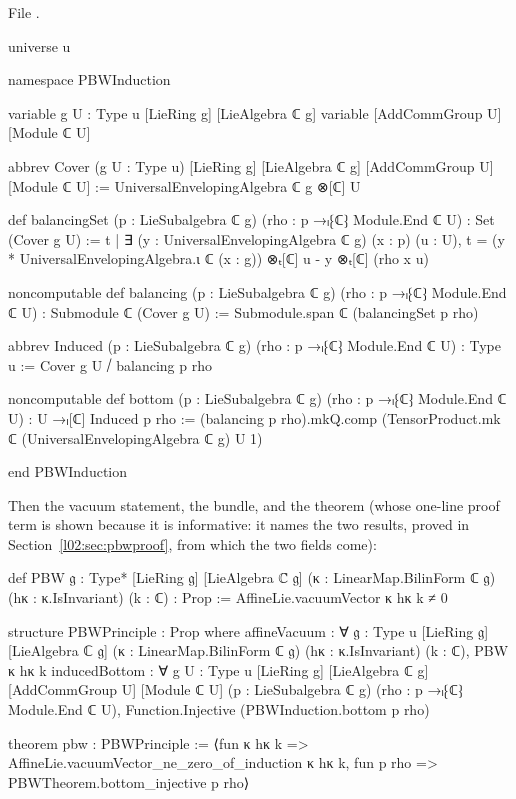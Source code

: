 File .
\begin{leancode}
universe u

namespace PBWInduction

variable {g U : Type u} [LieRing g] [LieAlgebra ℂ g]
variable [AddCommGroup U] [Module ℂ U]

abbrev Cover (g U : Type u) [LieRing g] [LieAlgebra ℂ g]
    [AddCommGroup U] [Module ℂ U] :=
  UniversalEnvelopingAlgebra ℂ g ⊗[ℂ] U

def balancingSet (p : LieSubalgebra ℂ g) (rho : p →ₗ⁅ℂ⁆ Module.End ℂ U) :
    Set (Cover g U) :=
  {t | ∃ (y : UniversalEnvelopingAlgebra ℂ g) (x : p) (u : U),
    t = (y * UniversalEnvelopingAlgebra.ι ℂ (x : g)) ⊗ₜ[ℂ] u - y ⊗ₜ[ℂ] (rho x u)}

noncomputable def balancing (p : LieSubalgebra ℂ g)
    (rho : p →ₗ⁅ℂ⁆ Module.End ℂ U) : Submodule ℂ (Cover g U) :=
  Submodule.span ℂ (balancingSet p rho)

abbrev Induced (p : LieSubalgebra ℂ g) (rho : p →ₗ⁅ℂ⁆ Module.End ℂ U) : Type u :=
  Cover g U ⧸ balancing p rho

noncomputable def bottom (p : LieSubalgebra ℂ g)
    (rho : p →ₗ⁅ℂ⁆ Module.End ℂ U) : U →ₗ[ℂ] Induced p rho :=
  (balancing p rho).mkQ.comp
    (TensorProduct.mk ℂ (UniversalEnvelopingAlgebra ℂ g) U 1)

end PBWInduction
\end{leancode}
Then the vacuum statement, the bundle, and the theorem (whose one-line proof term is shown because it
is informative: it names the two results, proved in Section~\ref{l02:sec:pbwproof}, from which the
two fields come):
\begin{leancode}
def PBW {𝔤 : Type*} [LieRing 𝔤] [LieAlgebra ℂ 𝔤]
    (κ : LinearMap.BilinForm ℂ 𝔤) (hκ : κ.IsInvariant) (k : ℂ) : Prop :=
  AffineLie.vacuumVector κ hκ k ≠ 0

structure PBWPrinciple : Prop where
  affineVacuum : ∀ {𝔤 : Type u} [LieRing 𝔤] [LieAlgebra ℂ 𝔤]
      (κ : LinearMap.BilinForm ℂ 𝔤) (hκ : κ.IsInvariant) (k : ℂ),
    PBW κ hκ k
  inducedBottom : ∀ {g U : Type u} [LieRing g] [LieAlgebra ℂ g]
      [AddCommGroup U] [Module ℂ U] (p : LieSubalgebra ℂ g)
      (rho : p →ₗ⁅ℂ⁆ Module.End ℂ U),
    Function.Injective (PBWInduction.bottom p rho)

theorem pbw : PBWPrinciple :=
  ⟨fun κ hκ k => AffineLie.vacuumVector_ne_zero_of_induction κ hκ k,
    fun p rho => PBWTheorem.bottom_injective p rho⟩
\end{leancode}

